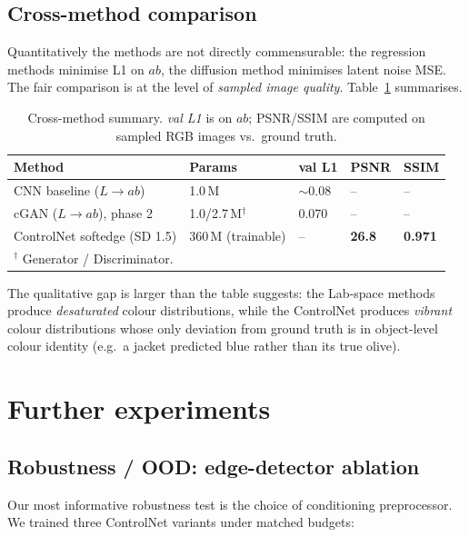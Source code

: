 \documentclass[conference]{IEEEtran}
\begin{document}
\subsection{Cross-method comparison}
Quantitatively the methods are not directly commensurable: the
regression methods minimise L1 on $ab$, the diffusion method minimises
latent noise MSE. The fair comparison is at the level of
\emph{sampled image quality}. Table~\ref{tab:summary} summarises.

\begin{table}[!t]
\centering
\caption{Cross-method summary. \textit{val L1} is on $ab$; PSNR/SSIM
are computed on sampled RGB images vs.\ ground truth.}
\label{tab:summary}
\setlength\tabcolsep{4pt}
\begin{tabular}{lllll}
\toprule
\textbf{Method} & \textbf{Params} & \textbf{val L1} & \textbf{PSNR} & \textbf{SSIM} \\
\midrule
CNN baseline ($L\!\to\!ab$)
                                    & 1.0\,M  & $\sim$0.08  & --      & --      \\
cGAN ($L\!\to\!ab$), phase 2        & 1.0/2.7\,M$^\dagger$ & 0.070 & --   & --   \\
ControlNet softedge (SD 1.5)        & 360\,M (trainable) & --    & \textbf{26.8} & \textbf{0.971} \\
\bottomrule
\multicolumn{5}{l}{\footnotesize $^\dagger$ Generator / Discriminator.}\\
\end{tabular}
\end{table}

The qualitative gap is larger than the table suggests: the Lab-space
methods produce \emph{desaturated} colour distributions, while the
ControlNet produces \emph{vibrant} colour distributions whose only
deviation from ground truth is in object-level colour identity
(e.g.\ a jacket predicted blue rather than its true olive).

\section{Further experiments}\label{sec:exp}

\subsection{Robustness / OOD: edge-detector ablation}
\label{sec:robust}
Our most informative robustness test is the choice of conditioning
preprocessor. We trained three ControlNet variants under matched
budgets:
\end{document}
